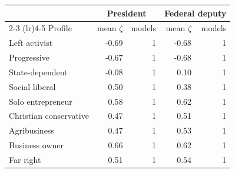 \begin{tabular}{lrrrr}
\toprule
 & \multicolumn{2}{c}{President} & \multicolumn{2}{c}{Federal deputy} \\
\cmidrule(lr){2-3} \cmidrule(lr){4-5}
Profile & mean $\zeta$ & models & mean $\zeta$ & models \\
\midrule
Left activist & -0.69 & 1 & -0.68 & 1 \\
Progressive & -0.67 & 1 & -0.68 & 1 \\
State-dependent & -0.08 & 1 & 0.10 & 1 \\
Social liberal & 0.50 & 1 & 0.38 & 1 \\
Solo entrepreneur & 0.58 & 1 & 0.62 & 1 \\
Christian conservative & 0.47 & 1 & 0.51 & 1 \\
Agribusiness & 0.47 & 1 & 0.53 & 1 \\
Business owner & 0.66 & 1 & 0.62 & 1 \\
Far right & 0.51 & 1 & 0.54 & 1 \\
\bottomrule
\end{tabular}
